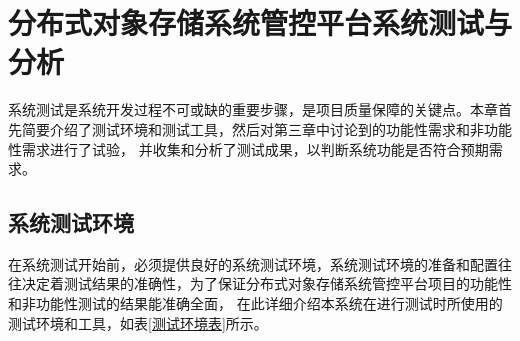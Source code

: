 \renewcommand{\arraystretch}{1.5}

\chapter{分布式对象存储系统管控平台系统测试与分析}

系统测试是系统开发过程不可或缺的重要步骤，是项目质量保障的关键点。本章首先简要介绍了测试环境和测试工具，然后对第三章中讨论到的功能性需求和非功能性需求进行了试验，
并收集和分析了测试成果，以判断系统功能是否符合预期需求。

\section{系统测试环境}

在系统测试开始前，必须提供良好的系统测试环境，系统测试环境的准备和配置往往决定着测试结果的准确性，为了保证分布式对象存储系统管控平台项目的功能性和非功能性测试的结果能准确全面，
在此详细介绍本系统在进行测试时所使用的测试环境和工具，如表\ref{测试环境表}所示。

\begin{center}
    \renewcommand\arraystretch{1.5}{
    }
    \vspace{-1cm}
\end{center}

